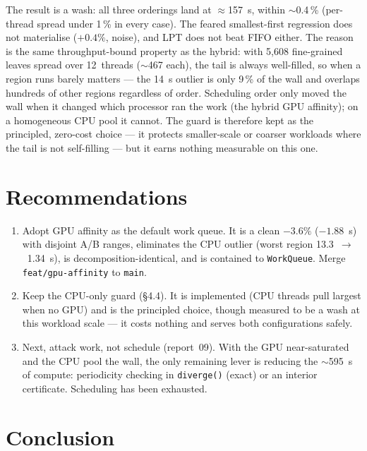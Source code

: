 \documentclass[
	english,
	letterpaper, oneside
]{article}
\begin{document}
The result is a wash: all three orderings land at $\approx$157~s, within
$\sim$0.4\,\% (per-thread spread under 1\,\% in every case). The feared
smallest-first regression does not materialise ($+0.4\%$, noise), and
LPT does not beat FIFO either. The reason is the same throughput-bound
property as the hybrid: with 5{,}608 fine-grained leaves spread over 12~threads
($\sim$467 each), the tail is always well-filled, so when a region runs barely
matters --- the 14~s outlier is only 9\,\% of the wall and overlaps hundreds of
other regions regardless of order. Scheduling order only moved the wall when it
changed which processor ran the work (the hybrid GPU affinity); on a
homogeneous CPU pool it cannot. The guard is therefore kept as the principled,
zero-cost choice --- it protects smaller-scale or coarser workloads where the
tail is not self-filling --- but it earns nothing measurable on this one.

\section{Recommendations}

\begin{enumerate}
    \item Adopt GPU affinity as the default work queue. It is a clean
    $-3.6\%$ ($-1.88$~s) with disjoint A/B ranges, eliminates the CPU outlier
    (worst region 13.3~$\to$~1.34~s), is decomposition-identical, and is contained
    to \texttt{WorkQueue}. Merge \texttt{feat/gpu-affinity} to \texttt{main}.

    \item Keep the CPU-only guard (§4.4). It is implemented (CPU threads
    pull largest when no GPU) and is the principled choice, though measured to be
    a wash at this workload scale --- it costs nothing and serves both
    configurations safely.

    \item Next, attack work, not schedule (report~09). With the GPU
    near-saturated and the CPU pool the wall, the only remaining lever is
    reducing the $\sim$595~s of compute: periodicity checking in \texttt{diverge()}
    (exact) or an interior certificate. Scheduling has been exhausted.
\end{enumerate}

\section{Conclusion}
\end{document}
